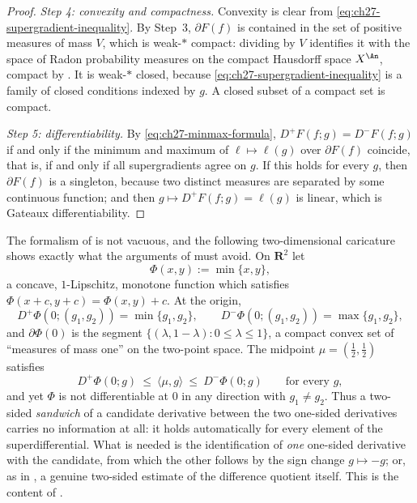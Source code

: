 \begin{proof}
\emph{Step 4: convexity and compactness.}
Convexity is clear from \eqref{eq:ch27-supergradient-inequality}.  By
Step~3, \(\partial F(f)\) is contained in the set of positive measures of
mass \(V\), which is weak-\(*\) compact: dividing by \(V\) identifies it
with the space of Radon probability measures on the compact Hausdorff space
\(X^{\An}\), compact by .  It is weak-\(*\) closed, because
\eqref{eq:ch27-supergradient-inequality} is a family of closed conditions
indexed by \(g\).  A closed subset of a compact set is compact.

\emph{Step 5: differentiability.}
By \eqref{eq:ch27-minmax-formula}, \(D^+F(f;g)=D^-F(f;g)\) if and only if
the minimum and maximum of \(\ell\mapsto\ell(g)\) over \(\partial F(f)\)
coincide, that is, if and only if all supergradients agree on \(g\).  If
this holds for every \(g\), then \(\partial F(f)\) is a singleton, because
two distinct measures are separated by some continuous function; and then
\(g\mapsto D^+F(f;g)=\ell(g)\) is linear, which is Gateaux differentiability.
\end{proof}

\begin{example}
\label{ex:ch27-corner-without-orthogonality}
The formalism of  is not vacuous, and the
following two-dimensional caricature shows exactly what the arguments of
 must avoid.  On \(\mathbf R^2\) let
\[
 \Phi(x,y):=\min\{x,y\},
\]
a concave, \(1\)-Lipschitz, monotone function which satisfies
\(\Phi(x+c,y+c)=\Phi(x,y)+c\).  At the origin,
\[
 D^+\Phi(0;(g_1,g_2))=\min\{g_1,g_2\},
 \qquad
 D^-\Phi(0;(g_1,g_2))=\max\{g_1,g_2\},
\]
and \(\partial\Phi(0)\) is the segment
\(\{(\lambda,1-\lambda):0\leq\lambda\leq1\}\), a compact convex set of
``measures of mass one'' on the two-point space.  The midpoint
\(\mu=(\tfrac12,\tfrac12)\) satisfies
\[
 D^+\Phi(0;g)\ \leq\ \langle\mu,g\rangle\ \leq\ D^-\Phi(0;g)
 \qquad\text{for every }g,
\]
and yet \(\Phi\) is not differentiable at \(0\) in any direction with
\(g_1\neq g_2\).  Thus a two-sided \emph{sandwich} of a candidate derivative
between the two one-sided derivatives carries no information at all: it
holds automatically for every element of the superdifferential.  What is
needed is the identification of \emph{one} one-sided derivative with the
candidate, from which the other follows by the sign change
\(g\mapsto-g\); or, as in
, a genuine two-sided
estimate of the difference quotient itself.  This is the content of
.
\end{example}


